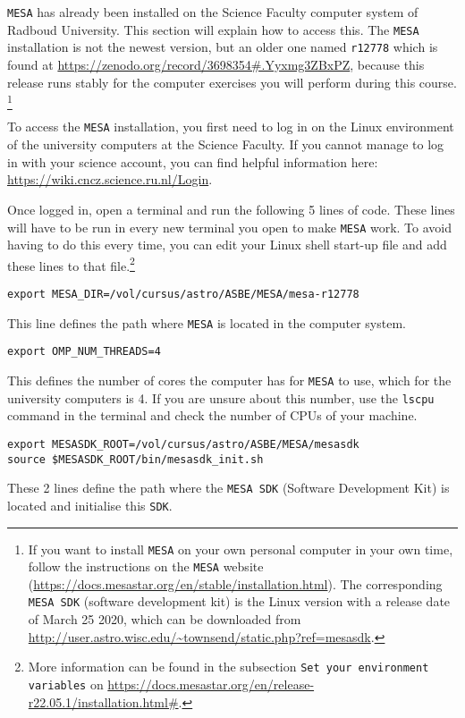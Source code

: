 \documentclass[11pt,a4paper]{article}
\begin{document}
\texttt{MESA} has already been installed on the Science Faculty computer system of Radboud University. This section will explain how to access this. The \texttt{MESA} installation is not the newest version, but an older one named \texttt{r12778} which is found at \url{https://zenodo.org/record/3698354#.Yyxmg3ZBxPZ}, because this release runs stably for the computer exercises you will perform during this course.
\footnote{If you want to install \texttt{MESA} on your own personal computer in your own time, follow the instructions on the \texttt{MESA} website (\url{https://docs.mesastar.org/en/stable/installation.html}). The corresponding \texttt{MESA SDK} (software development kit) is the Linux version with a release date of March 25 2020, which can be downloaded from \url{http://user.astro.wisc.edu/~townsend/static.php?ref=mesasdk}. }

\bigskip\noindent
To access the \texttt{MESA} installation, you first need to log in on the Linux environment of the university computers at the Science Faculty. If you cannot manage to log in with your science account, you can find helpful information here: \url{https://wiki.cncz.science.ru.nl/Login}. 

\bigskip\noindent
Once logged in, open a terminal and run the following 5 lines of code. These lines will have to be run in every new terminal you open to make \texttt{MESA} work. To avoid having to do this every time, you can edit your Linux shell start-up file and add these lines to that file.\footnote{More information can be found in the subsection \texttt{Set your environment variables} on \url{https://docs.mesastar.org/en/release-r22.05.1/installation.html\#}.}

\begin{verbatim}
export MESA_DIR=/vol/cursus/astro/ASBE/MESA/mesa-r12778
\end{verbatim}
This line defines the path where \texttt{MESA} is located in the computer system.

\begin{verbatim}
export OMP_NUM_THREADS=4
\end{verbatim}
This defines the number of cores the computer has for \texttt{MESA} to use, which for the university computers is 4. If you are unsure about this number, use the \texttt{lscpu} command in the terminal and check the number of CPUs of your machine.

\begin{verbatim}
export MESASDK_ROOT=/vol/cursus/astro/ASBE/MESA/mesasdk
source $MESASDK_ROOT/bin/mesasdk_init.sh
\end{verbatim}
These 2 lines define the path where the \texttt{MESA SDK} (Software Development Kit) is located and initialise this \texttt{SDK}. 
\end{document}
